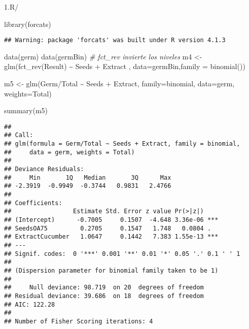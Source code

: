 \documentclass[
]{article}
\newenvironment{Shaded}{\begin{snugshade}}{\end{snugshade}}
\newcommand{\AttributeTok}[1]{\textcolor[rgb]{0.77,0.63,0.00}{#1}}
\newcommand{\CommentTok}[1]{\textcolor[rgb]{0.56,0.35,0.01}{\textit{#1}}}
\newcommand{\FunctionTok}[1]{\textcolor[rgb]{0.00,0.00,0.00}{#1}}
\newcommand{\NormalTok}[1]{#1}
\newcommand{\OtherTok}[1]{\textcolor[rgb]{0.56,0.35,0.01}{#1}}
\newcommand{\SpecialCharTok}[1]{\textcolor[rgb]{0.00,0.00,0.00}{#1}}
\begin{document}
1.R/

\begin{Shaded}
\begin{Highlighting}[]
\FunctionTok{library}\NormalTok{(forcats)}
\end{Highlighting}
\end{Shaded}

\begin{verbatim}
## Warning: package 'forcats' was built under R version 4.1.3
\end{verbatim}

\begin{Shaded}
\begin{Highlighting}[]
\FunctionTok{data}\NormalTok{(germ)}
\FunctionTok{data}\NormalTok{(germBin)}
\CommentTok{\# fct\_rev invierte los niveles}
\NormalTok{m4 }\OtherTok{\textless{}{-}} \FunctionTok{glm}\NormalTok{(}\FunctionTok{fct\_rev}\NormalTok{(Result) }\SpecialCharTok{\textasciitilde{}}\NormalTok{ Seeds }\SpecialCharTok{+}\NormalTok{ Extract , }\AttributeTok{data=}\NormalTok{germBin,}\AttributeTok{family =} \FunctionTok{binomial}\NormalTok{())}

\NormalTok{m5  }\OtherTok{\textless{}{-}} \FunctionTok{glm}\NormalTok{(Germ}\SpecialCharTok{/}\NormalTok{Total }\SpecialCharTok{\textasciitilde{}}\NormalTok{ Seeds }\SpecialCharTok{+}\NormalTok{ Extract, }\AttributeTok{family=}\NormalTok{binomial,}
\AttributeTok{data=}\NormalTok{germ, }\AttributeTok{weights=}\NormalTok{Total)}

\FunctionTok{summary}\NormalTok{(m5)}
\end{Highlighting}
\end{Shaded}

\begin{verbatim}
## 
## Call:
## glm(formula = Germ/Total ~ Seeds + Extract, family = binomial, 
##     data = germ, weights = Total)
## 
## Deviance Residuals: 
##     Min       1Q   Median       3Q      Max  
## -2.3919  -0.9949  -0.3744   0.9831   2.4766  
## 
## Coefficients:
##                 Estimate Std. Error z value Pr(>|z|)    
## (Intercept)      -0.7005     0.1507  -4.648 3.36e-06 ***
## SeedsOA75         0.2705     0.1547   1.748   0.0804 .  
## ExtractCucumber   1.0647     0.1442   7.383 1.55e-13 ***
## ---
## Signif. codes:  0 '***' 0.001 '**' 0.01 '*' 0.05 '.' 0.1 ' ' 1
## 
## (Dispersion parameter for binomial family taken to be 1)
## 
##     Null deviance: 98.719  on 20  degrees of freedom
## Residual deviance: 39.686  on 18  degrees of freedom
## AIC: 122.28
## 
## Number of Fisher Scoring iterations: 4
\end{verbatim}
\end{document}
